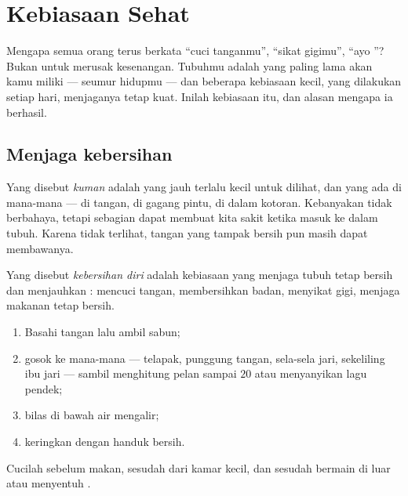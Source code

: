 \chapter{Kebiasaan Sehat}\label{ch:g1:healthy-habits}

Mengapa semua orang terus berkata ``cuci tanganmu'', ``sikat gigimu'',
``ayo ''? Bukan untuk merusak kesenangan. Tubuhmu adalah  yang paling lama akan kamu miliki --- seumur hidupmu --- dan
beberapa kebiasaan kecil, yang dilakukan setiap hari, menjaganya tetap
kuat. Inilah kebiasaan itu, dan alasan mengapa ia berhasil.

\section{Menjaga kebersihan}

\begin{definition}[Kuman]\label{def:g1:healthy-habits:germs}
Yang disebut \emph{kuman} adalah  yang jauh
terlalu kecil untuk dilihat, dan yang ada di mana-mana --- di tangan,
di gagang pintu, di dalam kotoran. Kebanyakan tidak berbahaya, tetapi
sebagian dapat membuat kita sakit ketika masuk ke dalam tubuh. Karena
tidak terlihat, tangan yang tampak bersih pun masih dapat membawanya.
\end{definition}

\begin{definition}\label{def:g1:healthy-habits:hygiene}
Yang disebut \emph{kebersihan diri} adalah
kebiasaan yang menjaga tubuh tetap bersih dan menjauhkan :
mencuci tangan, membersihkan badan, menyikat gigi, menjaga makanan
tetap bersih.
\end{definition}

\begin{method}\label{met:g1:healthy-habits:hands}
\begin{enumerate}
  \item Basahi tangan lalu ambil sabun;
  \item gosok ke mana-mana --- telapak, punggung tangan, sela-sela
        jari, sekeliling ibu jari --- sambil menghitung pelan sampai
        $20$ atau menyanyikan lagu pendek;
  \item bilas di bawah air mengalir;
  \item keringkan dengan handuk bersih.
\end{enumerate}
Cucilah sebelum makan, sesudah dari kamar kecil, dan sesudah bermain
di luar atau menyentuh .
\end{method}

